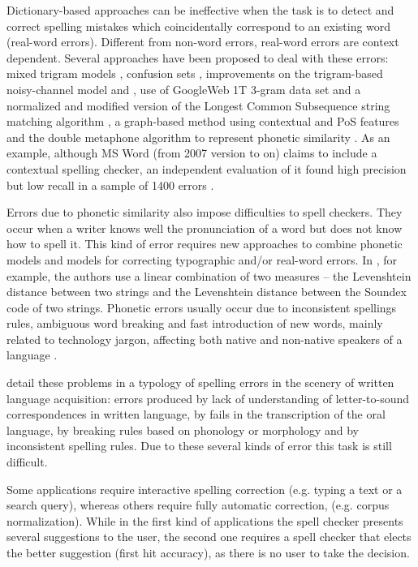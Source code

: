 Dictionary-based approaches can be ineffective when the task is to detect and correct spelling mistakes which coincidentally correspond to an existing word (real-word errors). Different from non-word errors, real-word errors are context dependent. Several approaches have been proposed to deal with these errors: mixed trigram models \cite{Fossati2007}, confusion sets \cite{Fossati2008}, improvements on the trigram-based noisy-channel model \cite{Mays1991} and \cite{WilcoxOHearn2008}, use of GoogleWeb 1T 3-gram data set and a normalized and modified version of the Longest Common Subsequence string matching algorithm \cite{Islam2009}, a graph-based method using contextual and PoS features and the double metaphone algorithm to represent phonetic similarity \cite{Sonmez2014}. As an example, although MS Word (from 2007 version to on) claims to include a contextual spelling checker, an independent evaluation of it found high precision but low recall in a sample of 1400 errors \cite{Hirst2008}.

Errors due to phonetic similarity also impose difficulties to spell checkers. They occur when a writer knows well the pronunciation of a word but does not know how to spell it. This kind of error requires new approaches to combine phonetic models and models for correcting typographic and/or real-word errors. In \cite{Zampieri2014}, for example, the authors use a linear combination of two measures -- the Levenshtein distance between
two strings and the Levenshtein distance between the Soundex \cite{soundex} code of two strings.
Phonetic errors usually occur due to inconsistent spellings rules, ambiguous word breaking and fast introduction of new words, mainly related to technology jargon, affecting both native and non-native speakers of a language \cite{Duan2011}. 

\cite{Baptista2011} detail these problems in a typology of spelling errors in the scenery of written language acquisition: errors produced by lack of understanding of  letter-to-sound correspondences in written language, by fails in the transcription of the oral language, by breaking rules based on phonology or morphology and by inconsistent spelling rules. Due to these several kinds of error this task is still difficult.

Some applications require interactive spelling correction (e.g. typing a text or a search query),  whereas others require fully automatic correction, (e.g. corpus normalization). While in the first kind of applications the spell checker presents several suggestions to the user, the second one requires a spell checker that elects the better suggestion (first hit accuracy), as there is no user to take the decision.

